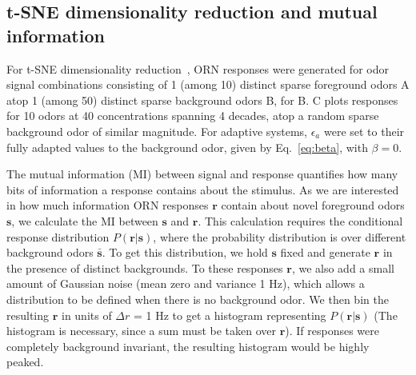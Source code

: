 \documentclass[9pt,lineno]{elife}
\begin{document}
\subsection{t-SNE dimensionality reduction and mutual information} 



For t-SNE dimensionality reduction~\citep{tsne}, ORN responses were generated for odor signal combinations consisting of 1 (among 10) distinct sparse foreground odors A atop 1 (among 50) distinct sparse background odors B, for B.  C plots responses for 10 odors at 40 concentrations spanning 4 decades, atop a random sparse background odor of similar magnitude. For adaptive systems, $\epsilon_a$ were set to their fully adapted values to the background odor, given by Eq.~\ref{eq:beta}, with $\beta = 0$. 


The mutual information (MI) between signal and response quantifies how many bits of information a response contains about the stimulus. As we are interested in how much information ORN responses $\mathbf r$ contain about novel foreground odors $\mathbf s$, we calculate the MI between $\mathbf s$ and $\mathbf r$. This calculation requires 
the conditional response distribution $P(\mathbf r| \mathbf s)$, where the probability distribution is over different background odors $\bar {\mathbf s}$. To get this distribution, we hold $\mathbf s$ fixed and generate $\mathbf r$ in the presence of distinct backgrounds. To these responses $\mathbf r$, we also add a small amount of Gaussian noise (mean zero and variance 1 Hz), which allows a distribution to be defined when there is no background odor. We then bin the resulting $\mathbf r$ in units of $\Delta r$ = 1 Hz to get a histogram representing $P(\mathbf r| \mathbf s)$ (The histogram is necessary, since a sum must be taken over $\mathbf r$). If responses were completely background invariant, the resulting histogram would be highly peaked. 

\end{document}
